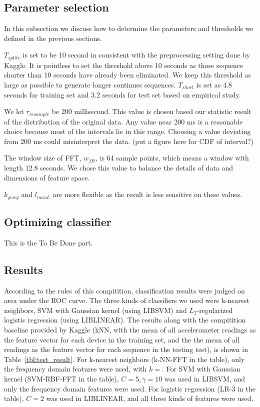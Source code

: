 \documentclass{article} %
\begin{document}
\subsection{Parameter selection}
In this subsection we discuss how to determine the parameters and thresholds we defined in the previous sections.

$T_{splite}$ is set to be 10 second in consistent with the preprocessing setting done by Kaggle. It is pointless to set the threshold above 10 seconds as those sequence shorter than 10 seconds have already been eliminated. We keep this threshold as large as possible to generate longer continues sequences. $T_{short}$ is set as 4.8 seconds for training set and 3.2 seconds for test set based on empirical study. 

We let $\tau_{resample}$ be 200 millisecond. This value is chosen based our statistic result of the distribution of the original data. Any value near 200 ms is a reasonable choice because most of the intervals lie in this range. Choosing a value deviating from 200 ms could misinterpret the data. (put a figure here for CDF of interval?)

The window size of FFT, $w_{fft}$, is 64 sample points, which means a window with length 12.8 seconds. We chose this value to balance the details of data and dimensions of feature space. 

$k_{\#seq}$ and  $l_{maxL}$ are more flexible as the result is less sensitive on these values.

\subsection{Optimizing classifier}
This is the To Be Done part.

\subsection{Results}

According to the rules of this compitition, classification results were judged on area under the ROC curve. The three kinds of classifiers we used were k-nearest neighbors, SVM with Gaussian kernel (using LIBSVM) and $L_2$-regularized logistic regression (using LIBLINEAR). The results along with the compitition baseline provided by Kaggle (kNN, with the mean of all accelerometer readings as the feature vector for each device in the training set, and the the mean of all readings as the feature vector for each sequence in the testing test), is shown in Table~\ref{tbl:test_result}. For k-nearest neighbors (k-NN-FFT in the table), only the frequency domain features were used, with $k=$. For SVM with Gaussian kernel (SVM-RBF-FFT in the table), $C=5, \gamma=10$ was used in LIBSVM, and only the frequency domain features were used. For logistic regression (LR-3 in the table), $C=2$ was used in LIBLINEAR, and all three kinds of features were used.
\end{document}
